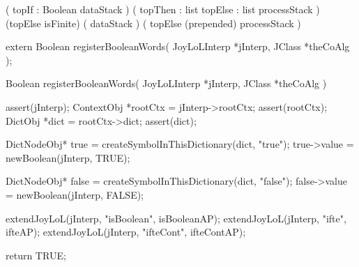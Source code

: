 \preDataStack
  (
    topIf : Boolean
    dataStack
  )
\preProcessStack
  (
    topThen : list
    topElse : list
    processStack
  )
\preConditions
  (topElse isFinite)
\postDataStack
  (
    dataStack
  )
\postProcessStack
  (
    topElse (prepended)
    processStack
  )
\postConditions
\stopRule

\stopJoyLoLWord

\startCHeader
extern Boolean registerBooleanWords(
  JoyLoLInterp *jInterp,
  JClass       *theCoAlg
);
\stopCHeader
{}

\startCCode
Boolean registerBooleanWords(
  JoyLoLInterp *jInterp,
  JClass       *theCoAlg
) {
  assert(jInterp);
  ContextObj *rootCtx = jInterp->rootCtx;
  assert(rootCtx);
  DictObj *dict = rootCtx->dict;
  assert(dict);
  
  DictNodeObj* true  =
    createSymbolInThisDictionary(dict, "true");
  true->value = newBoolean(jInterp, TRUE);

  DictNodeObj* false =
    createSymbolInThisDictionary(dict, "false");
  false->value = newBoolean(jInterp, FALSE);

  extendJoyLoL(jInterp, "isBoolean", isBooleanAP);
  extendJoyLoL(jInterp, "ifte",      ifteAP);
  extendJoyLoL(jInterp, "ifteCont",  ifteContAP);
  
  return TRUE;
}
\stopCCode

